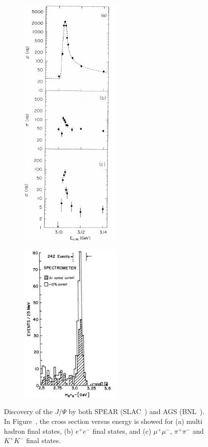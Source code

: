 	\begin{figure}[H]
		\begin{subfigure}{0.5\linewidth}
			\centering
			\includegraphics[width=5cm]{fig/chapt2/JPsi-discovery-SPEAR.png}
			\caption{\label{fig:JPsi:A}}
		\end{subfigure}
		\begin{subfigure}{0.5\linewidth}
			\centering
			\includegraphics[width=5cm]{fig/chapt2/JPsi-discovery-AGS.png}
			\caption{\label{fig:JPsi:B}}
		\end{subfigure}
		\caption{\label{fig:JPsi} Discovery of the $J/\Psi$ by both  SPEAR (SLAC~\cite{RICHTER1974}) and  AGS (BNL~\cite{TING1974}). In Figure~, the cross section versus energy is showed for (a) multi hadron final states, (b) $e^+e^-$ final states, and (c) $\mu^+\mu^-$, $\pi^+\pi^-$ and $K^+K^-$ final states.}
	\end{figure}
	
